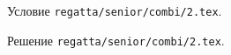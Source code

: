 \problem
Условие \texttt{regatta/senior/combi/2.tex}.

\solution Решение \texttt{regatta/senior/combi/2.tex}.
\endproblem
